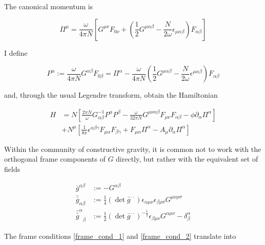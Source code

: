 \documentclass[11pt]{article}
\begin{document}
The canonical momentum is

\begin{equation}
	\Pi^\mu = \frac{\omega}{4 \pi N} 
	\left[ G^{\mu \nu} F_{0 \nu}
	+ \left( \frac{1}{2} G^{ \mu \alpha \beta} 
	- \frac{N}{2 \omega} \epsilon_{ \mu \alpha \beta}
	\right)
	F_{\alpha \beta}
	\right]
\end{equation}

I define 

\begin{equation}
	P^\alpha :=
	\frac{\omega}{4 \pi N} G^{\alpha \beta} F_{0 \beta}
	= \Pi^\alpha 
	- \frac{\omega}{4 \pi N} 
	\left( 
	\frac{1}{2} G^{\mu \alpha \beta} 
	- \frac{N}{2 \omega} \epsilon^{\mu \alpha \beta}
	\right)
	F_{\alpha \beta}
\end{equation}

and, through the usual Legendre transform, obtain the Hamiltonian 

\begin{equation}
	\begin{split}
		H &= N
		\left[
		\frac{2 \pi N}{\omega} G^{-1}_{\alpha \beta} P^\alpha P^\beta
		- \frac{\omega}{32 \pi N} G^{\mu \nu \alpha \beta} F_{\mu \nu} F_{\alpha \beta}
		- \phi \partial_\alpha \Pi^\alpha
		\right]\\
		&+ N^\mu
		\left[
		\frac{1}{8 \pi} \epsilon^{\alpha \beta \gamma} F_{\mu \alpha} F_{\beta \gamma} 
		+ F_{\mu \alpha} \Pi^{\alpha} - A_\mu \partial_\alpha \Pi^\alpha
		\right]
	\end{split}
\end{equation}

Within the community of constructive gravity, it is common not to work with the orthogonal frame components of $G$ directly, but rather with the equivalent set of fields

\begin{align}
	\bar{g}^{\alpha \beta} 
	&:= - G^{\alpha \beta}\\
	\bar{\bar{g}}_{\alpha \beta}
	&:= \frac{1}{4}\left( \det{\bar{g}^{\cdot \cdot}} \right)
	\epsilon_{\alpha \mu \nu} \epsilon_{\beta \rho \sigma}
	G^{\mu \nu \rho \sigma}\\
	{\bar{\bar{\bar{g}}}^\alpha}_\beta
	&:= \frac{1}{2}\left( \det{\bar{g}^{\cdot \cdot}} \right)^{-\frac{1}{2}}
	\epsilon_{\beta \mu \nu} G^{\alpha \mu \nu}
	 - \delta^\alpha_\beta
\end{align}

The frame conditions \ref{frame_cond_1} and \ref{frame_cond_2} translate into
\end{document}
